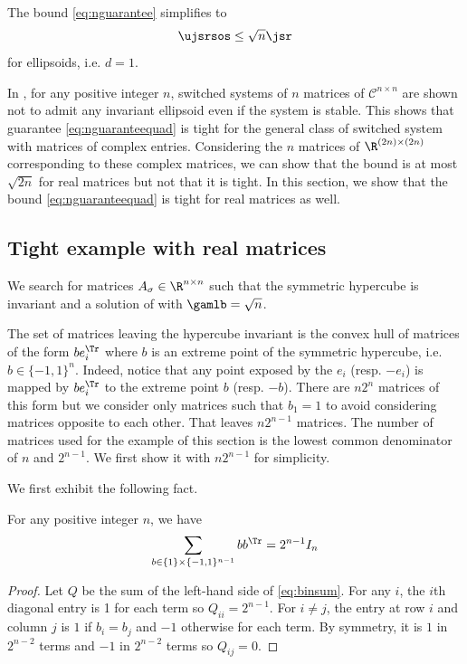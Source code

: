 \documentclass[11pt,twoside,a4paper,openright]{uclouvain-thesis}
\begin{document}
The bound \eqref{eq:nguarantee} simplifies to
\begin{align}
  \label{eq:nguaranteequad}
  \ujsrsos & \leq \sqrt{n} \jsr\\
\end{align}
for ellipsoids, i.e. $d = 1$.

In \cite{ando1998simultaneous}, for any positive integer $n$, switched systems of $n$ matrices of $\mathcal{C}^{n \times n}$ are shown not to admit any invariant ellipsoid even if the system is stable.
This shows that guarantee \eqref{eq:nguaranteequad} is tight
for the general class of switched system with matrices of complex entries.
Considering the $n$ matrices of $\R^{(2n) \times (2n)}$ corresponding to these complex matrices,
we can show that the bound is at most $\sqrt{2n}$ for real matrices but not that it is tight.
In this section, we show that the bound \eqref{eq:nguaranteequad}
is tight for real matrices as well.

\subsection{Tight example with real matrices}

We search for matrices $A_\sigma \in \R^{n \times n}$
such that the symmetric hypercube is invariant and
a solution of  with $\gamlb = \sqrt{n}$.

The set of matrices leaving the hypercube invariant is the convex hull of matrices
of the form $b e_i^\Tr$ where $b$ is an extreme point of the symmetric hypercube, i.e. $b \in \{-1, 1\}^n$.
Indeed, notice that any point exposed by the $e_i$ (resp. $-e_i$) is mapped by $b e_i^\Tr$ to the extreme point $b$ (resp. $-b$).
There are $n2^n$ matrices of this form but we consider
only matrices such that $b_1 = 1$ to avoid considering matrices opposite to each other.
That leaves $n2^{n-1}$ matrices.
The number of matrices used for the example of this section
is the lowest common denominator of $n$ and $2^{n-1}$.
We first show it with $n 2^{n-1}$ for simplicity.

We first exhibit the following fact.
\begin{mylem}
  \label{lem:binsum}
  For any positive integer $n$, we have
  \begin{equation}
    \label{eq:binsum}
    \sum_{b \in \{1\} \times \{-1, 1\}^{n-1}} bb^\Tr = 2^{n-1} I_n
  \end{equation}
  \begin{proof}
    Let $Q$ be the sum of the left-hand side of \eqref{eq:binsum}.
    For any $i$, the $i$th diagonal entry is 1 for each term so $Q_{ii} = 2^{n-1}$.
    For $i \neq j$, the entry at row $i$ and column $j$ is $1$ if $b_i = b_j$ and $-1$ otherwise for each term.
    By symmetry, it is $1$ in $2^{n-2}$ terms and $-1$ in $2^{n-2}$ terms so $Q_{ij} = 0$.
  \end{proof}
\end{mylem}
\end{document}

